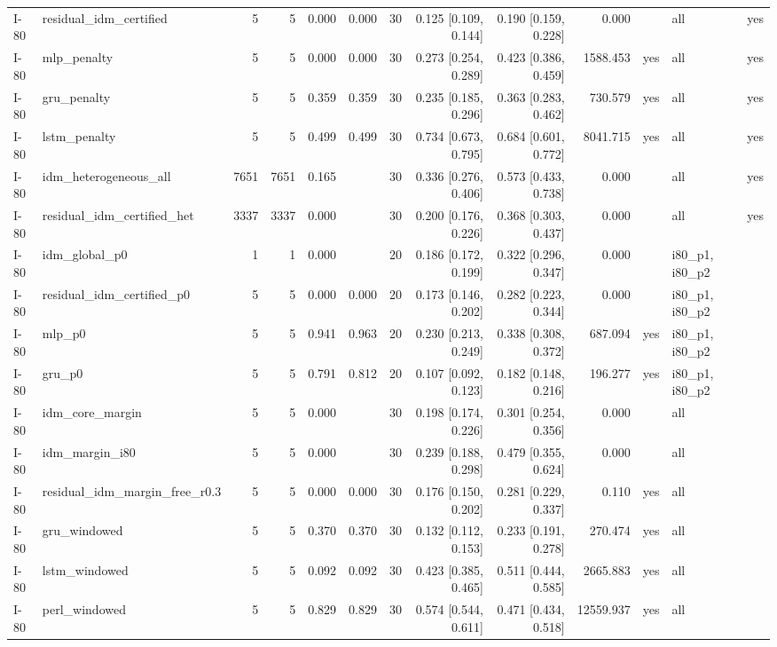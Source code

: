 \begin{table}[htbp]
{\begin{tabular}{llrrrrrrrrlll}
I-80 & residual\_idm\_certified & 5 & 5 & 0.000 & 0.000 & 30 & 0.125 [0.109, 0.144] & 0.190 [0.159, 0.228] & 0.000 &  & all & yes \\
I-80 & mlp\_penalty & 5 & 5 & 0.000 & 0.000 & 30 & 0.273 [0.254, 0.289] & 0.423 [0.386, 0.459] & 1588.453 & yes & all & yes \\
I-80 & gru\_penalty & 5 & 5 & 0.359 & 0.359 & 30 & 0.235 [0.185, 0.296] & 0.363 [0.283, 0.462] & 730.579 & yes & all & yes \\
I-80 & lstm\_penalty & 5 & 5 & 0.499 & 0.499 & 30 & 0.734 [0.673, 0.795] & 0.684 [0.601, 0.772] & 8041.715 & yes & all & yes \\
I-80 & idm\_heterogeneous\_all & 7651 & 7651 & 0.165 &  & 30 & 0.336 [0.276, 0.406] & 0.573 [0.433, 0.738] & 0.000 &  & all & yes \\
I-80 & residual\_idm\_certified\_het & 3337 & 3337 & 0.000 &  & 30 & 0.200 [0.176, 0.226] & 0.368 [0.303, 0.437] & 0.000 &  & all & yes \\
I-80 & idm\_global\_p0 & 1 & 1 & 0.000 &  & 20 & 0.186 [0.172, 0.199] & 0.322 [0.296, 0.347] & 0.000 &  & i80\_p1, i80\_p2 &  \\
I-80 & residual\_idm\_certified\_p0 & 5 & 5 & 0.000 & 0.000 & 20 & 0.173 [0.146, 0.202] & 0.282 [0.223, 0.344] & 0.000 &  & i80\_p1, i80\_p2 &  \\
I-80 & mlp\_p0 & 5 & 5 & 0.941 & 0.963 & 20 & 0.230 [0.213, 0.249] & 0.338 [0.308, 0.372] & 687.094 & yes & i80\_p1, i80\_p2 &  \\
I-80 & gru\_p0 & 5 & 5 & 0.791 & 0.812 & 20 & 0.107 [0.092, 0.123] & 0.182 [0.148, 0.216] & 196.277 & yes & i80\_p1, i80\_p2 &  \\
I-80 & idm\_core\_margin & 5 & 5 & 0.000 &  & 30 & 0.198 [0.174, 0.226] & 0.301 [0.254, 0.356] & 0.000 &  & all &  \\
I-80 & idm\_margin\_i80 & 5 & 5 & 0.000 &  & 30 & 0.239 [0.188, 0.298] & 0.479 [0.355, 0.624] & 0.000 &  & all &  \\
I-80 & residual\_idm\_margin\_free\_r0.3 & 5 & 5 & 0.000 & 0.000 & 30 & 0.176 [0.150, 0.202] & 0.281 [0.229, 0.337] & 0.110 & yes & all &  \\
I-80 & gru\_windowed & 5 & 5 & 0.370 & 0.370 & 30 & 0.132 [0.112, 0.153] & 0.233 [0.191, 0.278] & 270.474 & yes & all &  \\
I-80 & lstm\_windowed & 5 & 5 & 0.092 & 0.092 & 30 & 0.423 [0.385, 0.465] & 0.511 [0.444, 0.585] & 2665.883 & yes & all &  \\
I-80 & perl\_windowed & 5 & 5 & 0.829 & 0.829 & 30 & 0.574 [0.544, 0.611] & 0.471 [0.434, 0.518] & 12559.937 & yes & all &  \\

\end{tabular}}
\end{table}
